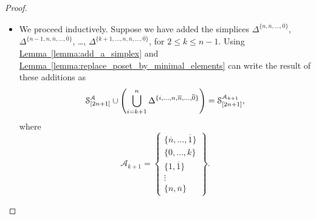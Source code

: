 \documentclass[main.tex]{subfiles}
\begin{document}
\begin{proof}
\begin{enumerate}
\begin{itemize}
        \item We proceed inductively. Suppose we have added the simplices $\Delta^{\{n, \overline{n}, \ldots, \overline{0}\}}$, $\Delta^{\{n-1, n, \overline{n}, \ldots, \overline{0}\}}$, \dots, $\Delta^{\{k+1, \ldots, n, \overline{n}, \ldots, \overline{0}\}}$, for $2 \leq k \leq n-1$. Using \hyperref[lemma:add_a_simplex]{Lemma~\ref*{lemma:add_a_simplex}} and \hyperref[lemma:replace_poset_by_minimal_elements]{Lemma~\ref*{lemma:replace_poset_by_minimal_elements}} can write the result of these additions as
          \begin{equation*}
            \S^{\mathcal{A}}_{[2n+1]} \cup \left( \bigcup_{i = k+1}^{n} \Delta^{\{i, \ldots, n, \overline{n}, \ldots, \overline{0}\}}\right) = \S^{\mathcal{A}_{k+1}}_{[2n+1]},
          \end{equation*}
          where 
          \begin{equation*}
            \mathcal{A}_{k+1} = \left\{ \substack{ \{\overline{n}, \ldots, \overline{1}\} \\ \{0, \ldots, k\} \\ \{1, \overline{1}\} \\ \vdots \\ \{n, \overline{n}\} } \right\}.
          \end{equation*}


\end{itemize}
\end{enumerate}
\end{proof}
\end{document}
